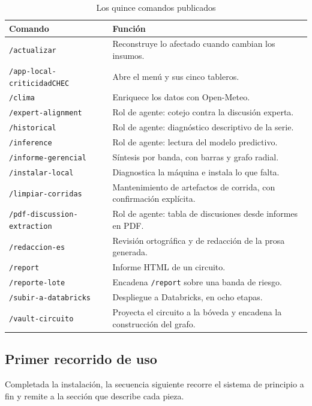 \documentclass[11pt,a4paper]{article}
\begin{document}
\begin{table}[H]
\centering
\caption{Los quince comandos publicados}
\label{tab:comandos}
\footnotesize
\begin{tabularx}{\textwidth}{L{4.6cm} X}
\toprule
\textbf{Comando} & \textbf{Función} \\
\midrule
\texttt{/actualizar} & Reconstruye lo afectado cuando cambian los insumos. \\
\texttt{/app-local-criticidadCHEC} & Abre el menú y sus cinco tableros. \\
\texttt{/clima} & Enriquece los datos con Open-Meteo. \\
\texttt{/expert-alignment} & Rol de agente: cotejo contra la discusión experta. \\
\texttt{/historical} & Rol de agente: diagnóstico descriptivo de la serie. \\
\texttt{/inference} & Rol de agente: lectura del modelo predictivo. \\
\texttt{/informe-gerencial} & Síntesis por banda, con barras y grafo radial. \\
\texttt{/instalar-local} & Diagnostica la máquina e instala lo que falta. \\
\texttt{/limpiar-corridas} & Mantenimiento de artefactos de corrida, con confirmación explícita. \\
\texttt{/pdf-discussion-extraction} & Rol de agente: tabla de discusiones desde informes en PDF. \\
\texttt{/redaccion-es} & Revisión ortográfica y de redacción de la prosa generada. \\
\texttt{/report} & Informe HTML de un circuito. \\
\texttt{/reporte-lote} & Encadena \texttt{/report} sobre una banda de riesgo. \\
\texttt{/subir-a-databricks} & Despliegue a Databricks, en ocho etapas. \\
\texttt{/vault-circuito} & Proyecta el circuito a la bóveda y encadena la construcción del grafo. \\
\bottomrule
\end{tabularx}
\end{table}

\subsection{Primer recorrido de uso}

Completada la instalación, la secuencia siguiente recorre el sistema de principio a fin y
remite a la sección que describe cada pieza.
\end{document}
